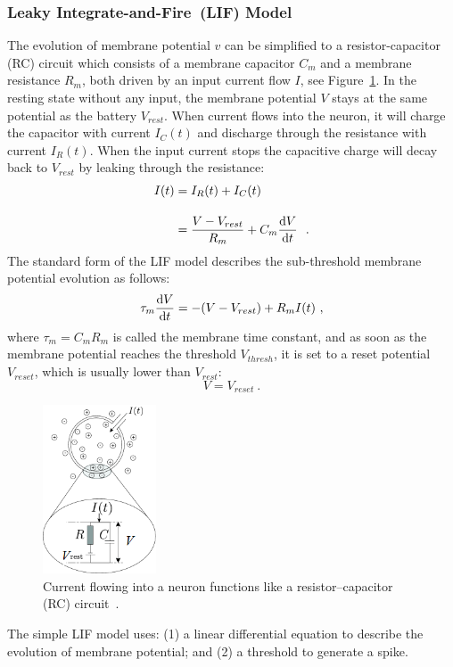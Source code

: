 \subsubsection{Leaky Integrate-and-Fire~(LIF) Model}
The evolution of membrane potential $v$ can be simplified to a resistor-capacitor (RC) circuit which consists of a membrane capacitor $C_m$ and a membrane resistance $R_m$, both driven by an input current flow $I$, see Figure~\ref{Fig:rc}.
In the resting state without any input, the membrane potential $V$ stays at the same potential as the battery $V_{rest}$.
When current flows into the neuron, it will charge the capacitor with current $I_C(t)$ and discharge through the resistance with current $I_R(t)$.
When the input current stops the capacitive charge will decay back to $V_{rest}$ by leaking through the resistance:
\begin{equation}
\begin{aligned}
	I(t) &= I_R(t) + I_C(t) \\[10pt]
	&= \dfrac{V-V_{rest}}{R_m} + C_m \dfrac{\mathrm{d} V}{\mathrm{d} t}~~.
\end{aligned}
\label{equ:LIF_current}
\end{equation}
The standard form of the LIF model describes the sub-threshold membrane potential evolution as follows:
\begin{equation}
	\tau_m \dfrac{\mathrm{d} V}{\mathrm{d} t} = -(V-V_{rest}) + R_m I(t)~,
\end{equation}
where $\tau_m = C_m R_m$ is called the membrane time constant, and as soon as the membrane potential reaches the threshold $V_{thresh}$, it is set to a reset potential $V_{reset}$, which is usually lower than $V_{rest}$: 
\begin{equation}
V = V_{reset}~.
\end{equation}

\begin{figure}[tb!]
	\centering
	\includegraphics[width=0.3\textwidth]{pics_snn/RC.png}
	\caption{Current flowing into a neuron functions like a resistor–capacitor (RC) circuit~\citep{gerstner2014neuronal}.}
	\label{Fig:rc}
\end{figure}
The simple LIF model uses: (1) a linear differential equation to describe the evolution of membrane potential;
and (2) a threshold to generate a spike.

